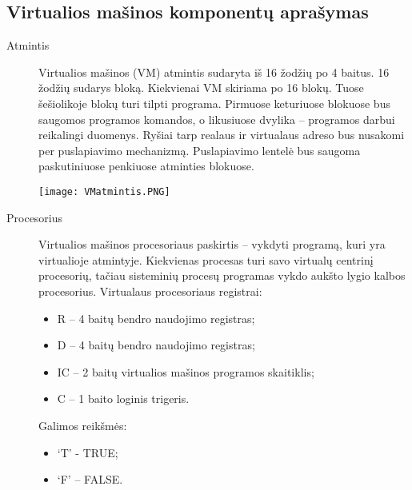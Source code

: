 \subsection{Virtualios mašinos komponentų aprašymas}
\begin{description}
\item[Atmintis] \leavevmode 

Virtualios mašinos (VM) atmintis sudaryta iš 16 žodžių po 4 baitus. 16 žodžių sudarys bloką. Kiekvienai VM skiriama po 16 blokų. Tuose šešiolikoje blokų turi tilpti programa.
Pirmuose keturiuose blokuose bus saugomos programos komandos, o likusiuose dvylika – programos darbui reikalingi duomenys.
Ryšiai tarp realaus ir virtualaus adreso bus nusakomi per puslapiavimo mechanizmą. Puslapiavimo lentelė bus saugoma paskutiniuose penkiuose atminties blokuose.


\texttt{[image: VMatmintis.PNG]}

\item[Procesorius]  \leavevmode 
  
Virtualios mašinos procesoriaus paskirtis – vykdyti programą, kuri yra virtualioje atmintyje. Kiekvienas procesas turi savo virtualų centrinį procesorių, tačiau sisteminių procesų programas vykdo aukšto lygio kalbos procesorius. 
Virtualaus procesoriaus registrai:
\begin{itemize}
\item R – 4 baitų bendro naudojimo registras;
\item D – 4 baitų bendro naudojimo registras;
\item IC – 2 baitų virtualios mašinos programos skaitiklis;
\item C – 1 baito loginis trigeris.
\end{itemize}
Galimos reikšmės:
\begin{itemize}
\item `T' - TRUE;
\item `F' – FALSE.
\end{itemize}  
  

\end{description}
